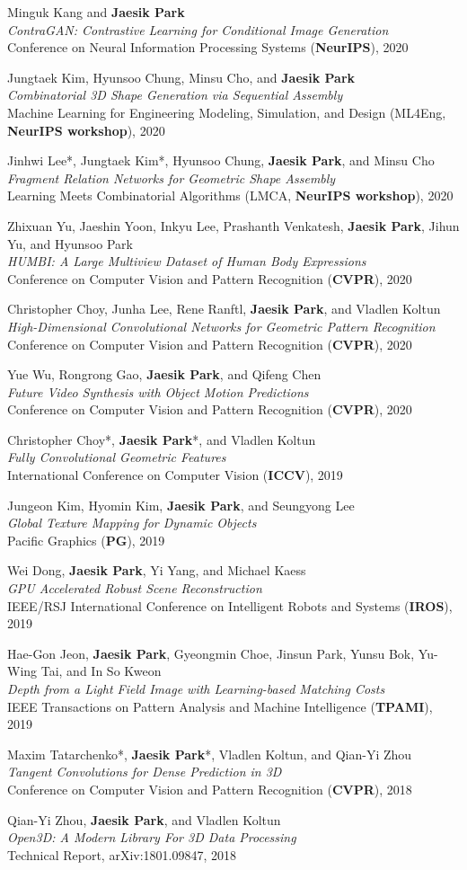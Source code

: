 \documentclass[letterpaper,11pt]{article}
\newcommand{\publicationItem}[3]{
  \small{
  \item{#1\\ \emph{#2}\\ #3\vspace{-2pt}}
  }
}
\begin{document}
    \publicationItem{Minguk Kang and \textbf{Jaesik Park}}{ContraGAN: Contrastive Learning for Conditional Image Generation}{Conference on Neural Information Processing Systems (\textbf{NeurIPS}), 2020}
    \publicationItem{Jungtaek Kim, Hyunsoo Chung, Minsu Cho, and \textbf{Jaesik Park}}{Combinatorial 3D Shape Generation via Sequential Assembly}{Machine Learning for Engineering Modeling, Simulation, and Design (ML4Eng, \textbf{NeurIPS workshop}), 2020}
    \publicationItem{Jinhwi Lee*, Jungtaek Kim*, Hyunsoo Chung, \textbf{Jaesik Park}, and Minsu Cho}{Fragment Relation Networks for Geometric Shape Assembly}{Learning Meets Combinatorial Algorithms (LMCA, \textbf{NeurIPS workshop}), 2020}
    \publicationItem{Zhixuan Yu, Jaeshin Yoon, Inkyu Lee, Prashanth Venkatesh, \textbf{Jaesik Park}, Jihun Yu, and Hyunsoo Park}{HUMBI: A Large Multiview Dataset of Human Body Expressions}{Conference on Computer Vision and Pattern Recognition (\textbf{CVPR}), 2020}
    \publicationItem{Christopher Choy, Junha Lee, Rene Ranftl, \textbf{Jaesik Park}, and Vladlen Koltun}{High-Dimensional Convolutional Networks for Geometric Pattern Recognition}{Conference on Computer Vision and Pattern Recognition (\textbf{CVPR}), 2020}
    \publicationItem{Yue Wu, Rongrong Gao, \textbf{Jaesik Park}, and Qifeng Chen}{Future Video Synthesis with Object Motion Predictions}{Conference on Computer Vision and Pattern Recognition (\textbf{CVPR}), 2020}
    \publicationItem{Christopher Choy*, \textbf{Jaesik Park}*, and Vladlen Koltun}{Fully Convolutional Geometric Features}{International Conference on Computer Vision (\textbf{ICCV}), 2019}
    \publicationItem{Jungeon Kim, Hyomin Kim, \textbf{Jaesik Park}, and Seungyong Lee}{Global Texture Mapping for Dynamic Objects}{Pacific Graphics (\textbf{PG}), 2019}
    \publicationItem{Wei Dong, \textbf{Jaesik Park}, Yi Yang, and Michael Kaess}{GPU Accelerated Robust Scene Reconstruction}{IEEE/RSJ International Conference on Intelligent Robots and Systems (\textbf{IROS}), 2019}
    \publicationItem{Hae-Gon Jeon, \textbf{Jaesik Park}, Gyeongmin Choe, Jinsun Park, Yunsu Bok, Yu-Wing Tai, and In So Kweon}{Depth from a Light Field Image with Learning-based Matching Costs}{IEEE Transactions on Pattern Analysis and Machine Intelligence (\textbf{TPAMI}), 2019}
    \publicationItem{Maxim Tatarchenko*, \textbf{Jaesik Park}*, Vladlen Koltun, and Qian-Yi Zhou}{Tangent Convolutions for Dense Prediction in 3D}{Conference on Computer Vision and Pattern Recognition (\textbf{CVPR}), 2018}
    \publicationItem{Qian-Yi Zhou, \textbf{Jaesik Park}, and Vladlen Koltun}{Open3D: A Modern Library For 3D Data Processing}{Technical Report, arXiv:1801.09847, 2018}
\end{document}
